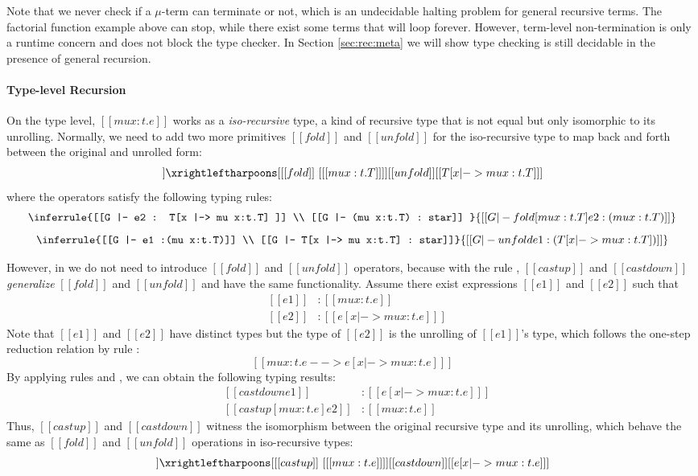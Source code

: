 Note that we never check if a $\mu$-term can terminate or not, which
is an undecidable halting problem for general recursive terms. The
factorial function example above can stop, while there exist some
terms that will loop forever. However, term-level non-termination is
only a runtime concern and does not block the type checker. In Section
\ref{sec:rec:meta} we will show type checking \name is still decidable
in the presence of general recursion.

\paragraph{Type-level Recursion}

On the type level, $[[mu x:t.e]]$ works as a \emph{iso-recursive}
type, a kind of recursive type that is not equal but only isomorphic
to its unrolling. Normally, we need to add two more primitives
$[[fold]]$ and $[[unfold]]$ for the iso-recursive type to map back
and forth between the original and unrolled form:
\begin{align*}
  [[mu x:t.T]] \xrightleftharpoons[{[[fold]]~[ [[mu x:t.T]] ]}]
  {[[unfold]]} [[T[x |-> mu x:t.T] ]]
\end{align*}
where the operators satisfy the following typing rules:
\[ \inferrule{[[G |- e2 : T[x |-> mu x:t.T] ]] \\ [[G |- (mu x:t.T) : star]] }
   {[[G |- fold [mu x:t.T] e2 : (mu x:t.T) ]]} \]
\[ \inferrule{[[G |- e1 :(mu x:t.T)]] \\ [[G |- T[x |-> mu x:t.T] : star]]}
   {[[G |- unfold e1 : (T[x |-> mu x:t.T]) ]]} \]

However, in \name we do not need to introduce $[[fold]]$ and
$[[unfold]]$ operators, because with the rule ,
$[[castup]]$ and $[[castdown]]$ \emph{generalize} $[[fold]]$ and
$[[unfold]]$ and have the same functionality. Assume there exist
expressions $[[e1]]$ and $[[e2]]$ such that
\[\begin{array}{lll}
	&[[e1]] &: [[mu x:t.e]]\\
	&[[e2]] &: [[e [x |-> mu x:t.e] ]]
\end{array}\]
Note that $[[e1]]$ and $[[e2]]$ have distinct types but the type of
$[[e2]]$ is the unrolling of $[[e1]]$'s type, which follows the
one-step reduction relation by rule :
\[ [[mu x:t.e --> e [x |-> mu x:t.e] ]] \]
By applying rules  and , we
can obtain the following typing results:
\[\begin{array}{lll}
	&[[castdown e1]] &: [[e [x |-> mu x:t.e] ]]\\
	&[[castup [mu x:t.e] e2]] &: [[mu x:t.e]]
\end{array}\]
Thus, $[[castup]]$ and $[[castdown]]$ witness the isomorphism between
the original recursive type and its unrolling, which behave the same
as $[[fold]]$ and $[[unfold]]$ operations in iso-recursive types:
\begin{align*}
  [[mu x:t.e]] \xrightleftharpoons[{[[castup]]~[ [[mu x:t.e]]
  ]}]{[[castdown]]} [[e[x |-> mu x:t.e] ]]
\end{align*}


